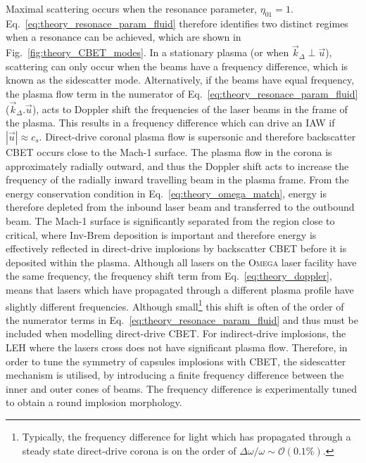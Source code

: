 Maximal scattering occurs when the resonance parameter, $\eta_{01}=1$.
Eq.~\ref{eq:theory_resonace_param_fluid} therefore identifies two distinct regimes when a resonance can be achieved, which are shown in Fig.~\ref{fig:theory_CBET_modes}.
In a stationary plasma (or when $\vec{k}_\Delta \perp \vec{u}$), scattering can only occur when the beams have a frequency difference, which is known as the sidescatter mode.
Alternatively, if the beams have equal frequency, the plasma flow term in the numerator of Eq.~\ref{eq:theory_resonace_param_fluid} ($\vec{k}_\Delta.\vec{u}$), acts to Doppler shift the frequencies of the laser beams in the frame of the plasma.
This results in a frequency difference which can drive an \ac{IAW} if $|\vec{u}|\approx c_s$.
Direct-drive coronal plasma flow is supersonic and therefore backscatter \ac{CBET} occurs close to the Mach-1 surface.
The plasma flow in the corona is approximately radially outward, and thus the Doppler shift acts to increase the frequency of the radially inward travelling beam in the plasma frame.
From the energy conservation condition in Eq.~\ref{eq:theory_omega_match}, energy is therefore depleted from the inbound laser beam and transferred to the outbound beam.
The Mach-1 surface is significantly separated from the region close to critical, where \ac{Inv-Brem} deposition is important and therefore energy is effectively reflected in direct-drive implosions by backscatter \ac{CBET} before it is deposited within the plasma.
Although all lasers on the \textsc{Omega} laser facility have the same frequency, the frequency shift term from Eq.~\ref{eq:theory_doppler}, means that lasers which have propagated through a different plasma profile have slightly different frequencies.
Although small\footnote{Typically, the frequency difference for light which has propagated through a steady state direct-drive corona is on the order of $\Delta\omega/\omega\sim\mathcal{O}(0.1\%)$.} this shift is often of the order of the numerator terms in Eq.~\ref{eq:theory_resonace_param_fluid} and thus must be included when modelling direct-drive \ac{CBET}.
For indirect-drive implosions, the \ac{LEH} where the lasers cross does not have significant plasma flow.
Therefore, in order to tune the symmetry of capsules implosions with \ac{CBET}, the sidescatter mechanism is utilised, by introducing a finite frequency difference between the inner and outer cones of beams.
The frequency difference is experimentally tuned to obtain a round implosion morphology.

